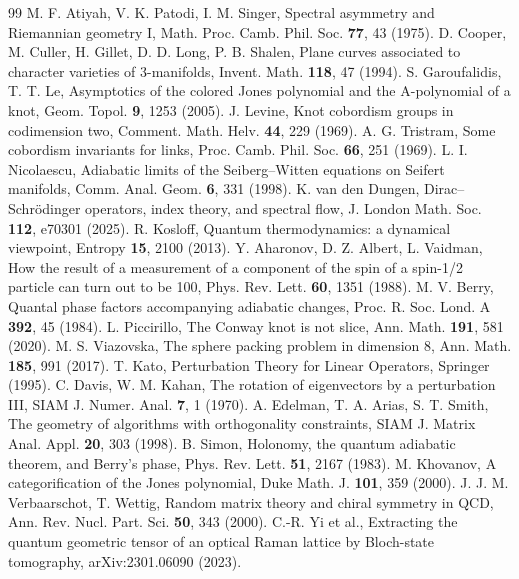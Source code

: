\documentclass[11pt]{article}
\theoremstyle{definition}
\theoremstyle{plain}
\begin{document}
\begin{thebibliography}{99}
 M. F. Atiyah, V. K. Patodi, I. M. Singer, Spectral asymmetry and Riemannian geometry I, Math. Proc. Camb. Phil. Soc. \textbf{77}, 43 (1975).
 D. Cooper, M. Culler, H. Gillet, D. D. Long, P. B. Shalen, Plane curves associated to character varieties of 3-manifolds, Invent. Math. \textbf{118}, 47 (1994).
 S. Garoufalidis, T. T. Le, Asymptotics of the colored Jones polynomial and the A-polynomial of a knot, Geom. Topol. \textbf{9}, 1253 (2005).
 J. Levine, Knot cobordism groups in codimension two, Comment. Math. Helv. \textbf{44}, 229 (1969).
 A. G. Tristram, Some cobordism invariants for links, Proc. Camb. Phil. Soc. \textbf{66}, 251 (1969).
 L. I. Nicolaescu, Adiabatic limits of the Seiberg--Witten equations on Seifert manifolds, Comm. Anal. Geom. \textbf{6}, 331 (1998).
 K. van den Dungen, Dirac--Schr\"odinger operators, index theory, and spectral flow, J. London Math. Soc. \textbf{112}, e70301 (2025).
 R. Kosloff, Quantum thermodynamics: a dynamical viewpoint, Entropy \textbf{15}, 2100 (2013).
 Y. Aharonov, D. Z. Albert, L. Vaidman, How the result of a measurement of a component of the spin of a spin-1/2 particle can turn out to be 100, Phys. Rev. Lett. \textbf{60}, 1351 (1988).
 M. V. Berry, Quantal phase factors accompanying adiabatic changes, Proc. R. Soc. Lond. A \textbf{392}, 45 (1984).
 L. Piccirillo, The Conway knot is not slice, Ann. Math. \textbf{191}, 581 (2020).
 M. S. Viazovska, The sphere packing problem in dimension 8, Ann. Math. \textbf{185}, 991 (2017).
 T. Kato, Perturbation Theory for Linear Operators, Springer (1995).
 C. Davis, W. M. Kahan, The rotation of eigenvectors by a perturbation III, SIAM J. Numer. Anal. \textbf{7}, 1 (1970).
 A. Edelman, T. A. Arias, S. T. Smith, The geometry of algorithms with orthogonality constraints, SIAM J. Matrix Anal. Appl. \textbf{20}, 303 (1998).
 B. Simon, Holonomy, the quantum adiabatic theorem, and Berry's phase, Phys. Rev. Lett. \textbf{51}, 2167 (1983).
 M. Khovanov, A categorification of the Jones polynomial, Duke Math. J. \textbf{101}, 359 (2000).
 J. J. M. Verbaarschot, T. Wettig, Random matrix theory and chiral symmetry in QCD, Ann. Rev. Nucl. Part. Sci. \textbf{50}, 343 (2000).
 C.-R. Yi et al., Extracting the quantum geometric tensor of an optical Raman lattice by Bloch-state tomography, arXiv:2301.06090 (2023).

\end{thebibliography}
\end{document}
